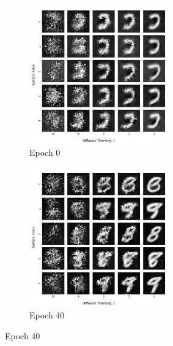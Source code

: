\documentclass[12pt]{article}
\begin{document}
\begin{figure}[hp]
    \begin{subfigure}{0.49\textwidth}
    \includegraphics[width=0.9\linewidth, height=6cm, center]{figures/diffusion_plot_10_0000.png}
    \caption{Epoch 0}
    \label{fig:10_0}
    \end{subfigure}
    \begin{subfigure}{0.49\textwidth}
    \includegraphics[width=0.9\linewidth, height=6cm, center]{figures/diffusion_plot_10_0040.png}
    \caption{Epoch 40}
    \label{fig:10_40}
    \end{subfigure}


\end{figure}
\end{document}
